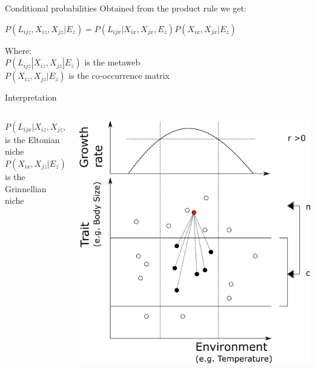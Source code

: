 \documentclass{eecslides}
\begin{document}

	\begin{frame}{Conditional probabilities}
	Obtained from the product rule we get:
		\begin{center}
			$P(L_{ijz},X_{iz},X_{jz}|E_z) = P(L_{ijx}|X_{ix},X_{jx},E_z)P(X_{ix},X_{jx}|E_z)$
		\end{center}
	Where:\\
	$P(L_{ijz}|X_{iz},X_{jz}|E_z)$ is the metaweb\\
 	$P(X_{iz},X_{jz}|E_z)$ is the co-occurrence matrix
		
	\end{frame}


	\begin{frame}{Interpretation}
 	    	\begin{columns}
			\begin{column}{0.3\textwidth}			
				$P(L_{ijx}|X_{iz},X_{jz},E_z)$ is the Eltonian niche\\
			 	$P(X_{ix},X_{jz}|E_z)$ is the Grinnellian niche
			\end{column}
			\begin{column}{0.7\textwidth}
				\begin{center}
					\includegraphics[height=0.65\textheight]{niche}\\
				\end{center}
			\end{column}				
		\end{columns}	   
	\end{frame}
\end{document}
